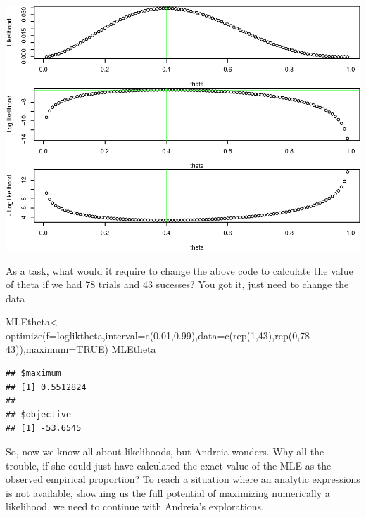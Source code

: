 \documentclass[
]{book}
\newenvironment{Shaded}{\begin{snugshade}}{\end{snugshade}}
\newcommand{\AttributeTok}[1]{\textcolor[rgb]{0.77,0.63,0.00}{#1}}
\newcommand{\ConstantTok}[1]{\textcolor[rgb]{0.00,0.00,0.00}{#1}}
\newcommand{\DecValTok}[1]{\textcolor[rgb]{0.00,0.00,0.81}{#1}}
\newcommand{\FloatTok}[1]{\textcolor[rgb]{0.00,0.00,0.81}{#1}}
\newcommand{\FunctionTok}[1]{\textcolor[rgb]{0.00,0.00,0.00}{#1}}
\newcommand{\NormalTok}[1]{#1}
\newcommand{\OtherTok}[1]{\textcolor[rgb]{0.56,0.35,0.01}{#1}}
\begin{document}
\includegraphics{ECOMODbook_files/figure-latex/ch13.169-1.pdf}

As a task, what would it require to change the above code to calculate the value of theta if we had 78 trials and 43 sucesses? You got it, just need to change the data

\begin{Shaded}
\begin{Highlighting}[]
\NormalTok{MLEtheta}\OtherTok{\textless{}{-}}\FunctionTok{optimize}\NormalTok{(}\AttributeTok{f=}\NormalTok{logliktheta,}\AttributeTok{interval=}\FunctionTok{c}\NormalTok{(}\FloatTok{0.01}\NormalTok{,}\FloatTok{0.99}\NormalTok{),}\AttributeTok{data=}\FunctionTok{c}\NormalTok{(}\FunctionTok{rep}\NormalTok{(}\DecValTok{1}\NormalTok{,}\DecValTok{43}\NormalTok{),}\FunctionTok{rep}\NormalTok{(}\DecValTok{0}\NormalTok{,}\DecValTok{78{-}43}\NormalTok{)),}\AttributeTok{maximum=}\ConstantTok{TRUE}\NormalTok{)}
\NormalTok{MLEtheta}
\end{Highlighting}
\end{Shaded}

\begin{verbatim}
## $maximum
## [1] 0.5512824
## 
## $objective
## [1] -53.6545
\end{verbatim}

So, now we know all about likelihoods, but Andreia wonders. Why all the trouble, if she could just have calculated the exact value of the MLE as the observed empirical proportion? To reach a situation where an analytic expressions is not available, showuing us the full potential of maximizing numerically a likelihood, we need to continue with Andreia's explorations.
\end{document}
